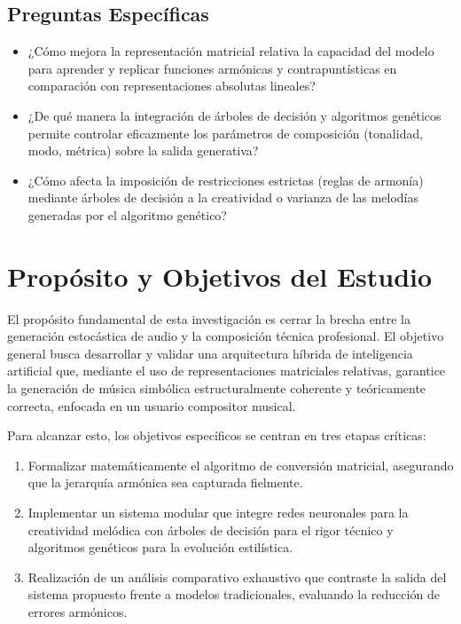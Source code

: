 \documentclass[12pt]{report}
\begin{document}
\subsection{Preguntas Específicas}
\begin{itemize}
    \item ¿Cómo mejora la representación matricial relativa la capacidad del modelo para aprender y replicar funciones armónicas y contrapuntísticas en comparación con representaciones absolutas lineales?
    \item ¿De qué manera la integración de árboles de decisión y algoritmos genéticos permite controlar eficazmente los parámetros de composición (tonalidad, modo, métrica) sobre la salida generativa?
    \item ¿Cómo afecta la imposición de restricciones estrictas (reglas de armonía) mediante árboles de decisión a la creatividad o varianza de las melodías generadas por el algoritmo genético?
\end{itemize}

\section{Propósito y Objetivos del Estudio}
El propósito fundamental de esta investigación es cerrar la brecha entre la generación estocástica de audio y la composición técnica profesional. El objetivo general busca desarrollar y validar una arquitectura híbrida de inteligencia artificial que, mediante el uso de representaciones matriciales relativas, garantice la generación de música simbólica estructuralmente coherente y teóricamente correcta, enfocada en un usuario compositor musical.

Para alcanzar esto, los objetivos específicos se centran en tres etapas críticas: 
\begin{enumerate}
\item Formalizar matemáticamente el algoritmo de conversión matricial, asegurando que la jerarquía armónica sea capturada fielmente.

\item Implementar un sistema modular que integre redes neuronales para la creatividad melódica con árboles de decisión para el rigor técnico y algoritmos genéticos para la evolución estilística.

\item Realización de un análisis comparativo exhaustivo que contraste la salida del sistema propuesto frente a modelos tradicionales, evaluando la reducción de errores armónicos.
\end{enumerate}
\end{document}
